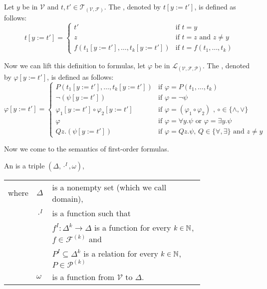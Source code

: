 \begin{definition}
	Let $y$ be in $\mathcal{V}$ and $t,t'\in\mathcal{T}_{(\mathcal{V},\mathcal{F})}$. The , denoted by $t\left[y:=t'\right]$, is defined as follows:
	\[t\left[y:=t'\right]=
		\begin{cases}
			t'                                                   & \text{if $t=y$}                \\ 
			z                                                    & \text{if $t=z$ and $z\neq y$}  \\%
			f(t_1\left[y:=t'\right],\dots,t_k\left[y:=t'\right]) & \text{if $t=f(t_1,\dots,t_k)$} 
		\end{cases}\]
	
	Now we can lift this definition to formulas, let $\varphi$ be in $\mathcal{L}_{(\mathcal{V},\mathcal{F},\mathcal{P})}$. The , denoted by $\varphi\left[y:=t'\right]$, is defined as follows:
	\[\varphi\left[y:=t'\right]=
		\begin{cases}
			P(t_1\left[y:=t'\right],\dots,t_k\left[y:=t'\right])        & \text{if $\varphi=P(t_1,\dots,t_k)$}                                     \\
			\neg(\psi\left[y:=t'\right])                                      & \text{if $\varphi=\neg\psi$}                                             \\ %
			\varphi_1\left[y:=t'\right]\circ\varphi_2\left[y:=t'\right] & \text{if $\varphi=(\varphi_1\circ\varphi_2)$ , $\circ\in\{\wedge,\vee\}$} \\
			\varphi                                                     & \text{if $\varphi=\forall y.\psi$ or $\varphi=\exists y.\psi$}                   \\
			Q z.(\psi\left[y:=t'\right])                                 & \text{if $\varphi=Q z.\psi$, $Q\in\{\forall,\exists\}$ and $z\neq y$}     
		\end{cases}\]

\end{definition}
Now we come to the semantics of first-order formulas.
\begin{definition}
	An  is a triple $(\Delta,\cdot^I,\omega)$,
	\begin{tabular}{llp{0.78\linewidth}}
		where & $\Delta$  & is a nonempty set (which we call  domain),                                                     \\
& $\cdot^I$ & is a function such that                                                                        \\
&           & $f^I\colon\Delta^k\to\Delta$  is a function for every $k\in\mathbb{N}$, $f\in\mathcal{F}^{(k)}$ and \\
&           & $P^I\subseteq\Delta^k$ is a relation for every $k\in\mathbb{N}$, $P\in\mathcal{P}^{(k)}$       \\
& $\omega$  & is a function from $\mathcal{V}$ to $\Delta$.                                                  
	\end{tabular}
\end{definition}
